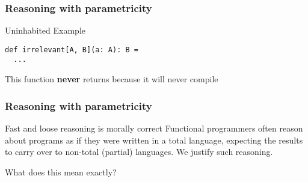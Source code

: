 \begin{frame}[fragile]
\frametitle{Reasoning with parametricity}
\begin{block}{Uninhabited Example}
\begin{lstlisting}[style=scala]
def irrelevant[A, B](a: A): B = 
  ...
\end{lstlisting}
\end{block}
\begin{theorem}This function \textbf{never} returns because it will never compile\end{theorem}
\end{frame}

\begin{frame}[fragile]
\frametitle{Reasoning with parametricity}
\begin{block}{Fast and loose reasoning is morally correct \cite{danielsson2006fast}}
\small{Functional programmers often reason about programs as if
they were written in a total language, expecting the results
to carry over to non-total (partial) languages. We justify
such reasoning.}
\end{block}
What does this mean exactly?
\end{frame}

